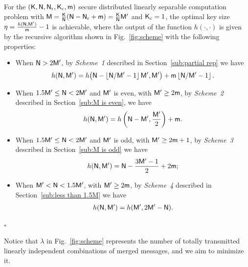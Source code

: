 \documentclass[conference,letterpaper]{IEEEtran}
\begin{document}
\begin{thm}
\label{thm:main achievable scheme}
For the $({\sf K},{\sf N},{\sf N}_{\rm r},{\sf K}_{\rm c}, {\sf m})$ secure distributed linearly separable computation problem with  ${\sf M}= \frac{{\sf K}}{{\sf N}} ({\sf N} - {\sf N}_{\rm r} + {\sf m})=\frac{{\sf K}}{{\sf N}} {\sf M}^{\prime}$ and ${\sf K}_{\rm c}=1$, the optimal key size  $\eta=  \frac{ h({\sf N},{\sf M}^{\prime})}{{\sf m}}-1$ is achievable, where the output of the function \( h(\cdot, \cdot) \) is given by the recursive algorithm shown in Fig.~\ref{fig:scheme} with the following properties:
 \begin{itemize}

 \item When  ${\sf N} > 2{\sf M}^{\prime}$,  by {\it Scheme~1} described in Section~\ref{sub:partial rep} we have  
\begin{align}
h({\sf N},{\sf M}^{\prime})=h\big({\sf N}-\left\lfloor {\sf N}/{\sf M}^{\prime}-1\right\rfloor {\sf M}^{\prime},{\sf M}^{\prime}\big)+ {\sf m}\left\lfloor {\sf N}/{\sf M}^{\prime} -1\right\rfloor  . \label{eq:from partial rep}
\end{align} 
\item When $1.5 {\sf M}^{\prime} \leq {\sf N} < 2 {\sf M}^{\prime}$ and ${\sf M}^{\prime}$ is even, with ${\sf M}^{\prime} \geq 2{\sf m}$,
by {\it Scheme~2} described in Section~\ref{sub:M is even}, we have  
\begin{align}
 h({\sf N}, {\sf M}^{\prime}) = h\left({\sf N} - {\sf M}^{\prime}, \frac{{\sf M}^{\prime}}{2}\right) + {\sf m}. \label{eq:M is even}
\end{align}

 \item When $1.5 {\sf M}^{\prime} \leq  {\sf N} < 2 {\sf M}^{\prime}$ and ${\sf M}^{\prime}$ is odd, with ${\sf M}^{\prime} \geq 2{\sf m}+1$, by  {\it Scheme~3} described in Section~\ref{sub:M is odd} we have  
 \begin{align}
 h({\sf N},{\sf M}^{\prime})=   {\sf N}-\frac{3{\sf M}^{\prime}-1}{2}+2 {\sf m}; \label{eq:M is odd}
 \end{align}
 \item When ${\sf M}^{\prime}< {\sf N} <  1.5 {\sf M}^{\prime}$, with ${\sf M}^{\prime} \geq 2{\sf m}$, by  {\it Scheme~4} described in Section~\ref{sub:less than 1.5M}  we have  
\begin{align}
h({\sf N},{\sf M}^{\prime})=h({\sf M}^{\prime},2{\sf M}^{\prime}-{\sf N}). \label{eq:less than 1.5M}
\end{align} 
  \end{itemize}
    \hfill $\square$ 
 \end{thm} 
Notice that $\lambda$ in Fig.~\ref{fig:scheme} represents the number of totally transmitted linearly independent combinations of merged messages, and we aim to minimize it.
 
\end{document}
